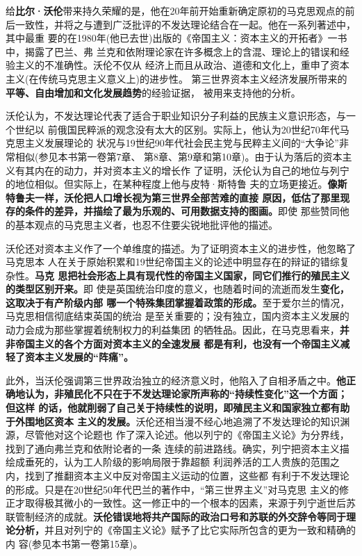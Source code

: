 给\textbf{比尔·沃伦}带来持久荣耀的是，他在20年前开始重新确定原初的马克思观点的前
后一致性，并将之与遭到广泛批评的不发达理论结合在一起。他在一系列著述中，其中最重
要的在1980年(他已去世)出版的《帝国主义：资本主义的开拓者》一书中，揭露了巴兰、弗
兰克和依附理论家在许多概念上的含混、理论上的错误和经验主义的不准确性。沃伦不仅从
经济上而且从政治、道德和文化上，重申了资本主义(在传统马克思主义意义上)的进步性。
第三世界资本主义经济发展所带来的\textbf{平等、自由增加和文化发展趋势}的经验证据，
被用来支持他的分析。

沃伦认为，不发达理论代表了适合于职业知识分子利益的民族主义意识形态，与一个世纪以
前俄国民粹派的观念没有太大的区别。实际上，他认为20世纪70年代马克思主义发展理论的
状况与19世纪90年代社会民主党与民粹主义间的“大争论”非常相似(参见本书第一卷第7章、
第8章、第9章和第10章)。由于认为落后的资本主义有其内在的动力，并对资本主义的增长作
了证明，沃伦认为自己的地位与列宁的地位相似。但实际上，在某种程度上他与皮特·斯特鲁
夫的立场更接近。\textbf{像斯特鲁夫一样，沃伦把人口增长视为第三世界全部苦难的直接
  原因，低估了那里现存的条件的差异，并描绘了最为乐观的、可用数据支持的图画。}即使
那些赞同他的基本观点的马克思主义者，也忍不住要尖锐地批评他的描述。

沃伦还对资本主义作了一个单维度的描述。为了证明资本主义的进步性，他忽略了马克思本
人在关于原始积累和19世纪帝国主义的论述中明显存在的辩证的错综复杂性。\textbf{马克
  思把社会形态上具有现代性的帝国主义国家，同它们推行的殖民主义的类型区别开来。}即
使是英国统治印度的意义，也随着时间的流逝而发生\textbf{变化，这取决于有产阶级内部
  哪一个特殊集团掌握着政策的形成。}至于爱尔兰的情况，马克思相信彻底结束英国的统治
是至关重要的；没有独立，国内资本主义发展的动力会成为那些掌握着统制权力的利益集团
的牺牲品。因此，在马克思看来，\textbf{并非帝国主义的各个方面对资本主义的全速发展
  都是有利，也没有一个帝国主义减轻了资本主义发展的“阵痛”。}

此外，当沃伦强调第三世界政治独立的经济意义时，他陷入了自相矛盾之中。\textbf{他正
  确地认为，非殖民化不只在于不发达理论家所声称的“持续性变化”这一个方面；但这样
  的话，他就削弱了自己关于持续性的说明，即殖民主义和国家独立都有助于外围地区资本
  主义的发展。}沃伦还相当漫不经心地追溯了不发达理论的知识渊源，尽管他对这个论题也
作了深入论述。他以列宁的《帝国主义论》为分界线，找到了通向弗兰克和依附论者的一条
连续的前进路线。确实，列宁把资本主义描绘成垂死的，认为工人阶级的影响局限于靠超额
利润养活的工人贵族的范围之内，找到了推翻资本主义中反对帝国主义运动的位置，这些都
有利于不发达理论的形成。只是在20世纪50年代巴兰的著作中，“第三世界主义”对马克思
主义的修正才取得极其微小的一致性。这一修正中的一个根本的因素，来源于列宁逝世后苏
联管制经济的成就。\textbf{沃伦错误地将共产国际的政治口号和苏联的外交辞令等同于理
  论分析，}并且对列宁的《帝国主义论》赋予了比它实际所包含的更为一致和精确的内
容(参见本书第一卷第15章)。

